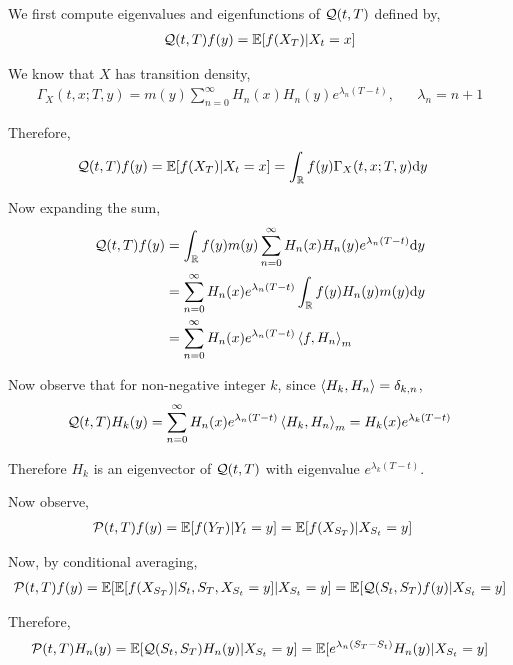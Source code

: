 \begin{solution}[Solution]
    We first compute eigenvalues and eigenfunctions of \( \mathcal{Q}(t,T) \) defined by,
    \begin{align*}
        \mathcal{Q}(t,T)f(y) =  \mathbb{E}[f(X_T)|X_t = x] 
    \end{align*}

    We know that \( X \) has transition density,
    \begin{align*}
        \Gamma_X(t,x;T,y) = m(y) \sum_{n=0}^{\infty}H_n(x)H_n(y)e^{\lambda_n (T-t)}, && \lambda_n = n+1
    \end{align*}

    Therefore,
    \begin{align*}
        \mathcal{Q}(t,T)f(y) &= \mathbb{E}[f(X_T)|X_t = x] 
        = \int_{\mathbb{R}} f(y) \Gamma_X(t,x;T,y) \mathrm{d} y
    \end{align*}

    Now expanding the sum,
    \begin{align*}    
        \mathcal{Q}(t,T)f(y) &= \int_{\mathbb{R}} f(y) m(y)\sum_{n=0}^\infty H_n(x)H_n(y) e^{\lambda_n (T-t)} \mathrm{d} y 
        \\&= \sum_{n=0}^{\infty} H_n(x)e^{\lambda_n (T-t)} \int_{\mathbb{R}} f(y) H_n(y) m(y) \mathrm{d} y
        \\&= \sum_{n=0}^{\infty} H_n(x) e^{\lambda_n (T-t)} \left\langle f,H_n \right\rangle_m
    \end{align*}

    Now observe that for non-negative integer \( k \), since \( \left\langle H_k,H_n \right\rangle = \delta_{k,n} \),
    \begin{align*}
        \mathcal{Q}(t,T) H_k(y) = \sum_{n=0}^{\infty} H_n(x) e^{\lambda_n (T-t)} \left\langle H_k,H_n \right\rangle_m
        = H_k(x)e^{\lambda_k (T-t)}
    \end{align*}

    Therefore \( H_k \) is an eigenvector of \( \mathcal{Q}(t,T) \) with eigenvalue \( e^{\lambda_k (T-t)} \).

    Now observe,
    \begin{align*}
        \mathcal{P}(t,T)f(y) &= \mathbb{E}[f(Y_T) | Y_t = y]
        = \mathbb{E}[f(X_{S_T})|X_{S_t}=y]
    \end{align*}

    Now, by conditional averaging,
    \begin{align*}
        \mathcal{P}(t,T)f(y) = \mathbb{E}[\mathbb{E}[f(X_{S_T}) | S_t,S_T, X_{S_t} = y] | X_{S_t}= y]
        = \mathbb{E}[\mathcal{Q}(S_t,S_T)f(y) | X_{S_t} =y ]
    \end{align*}
    
    Therefore,
    \begin{align*}
        \mathcal{P}(t,T)H_n(y) 
        = \mathbb{E}[\mathcal{Q}(S_t,S_T) H_n(y) | X_{S_t} = y]
        = \mathbb{E}[e^{\lambda_n (S_T-S_t)} H_n(y) | X_{S_t} = y]
    \end{align*}


\end{solution}
